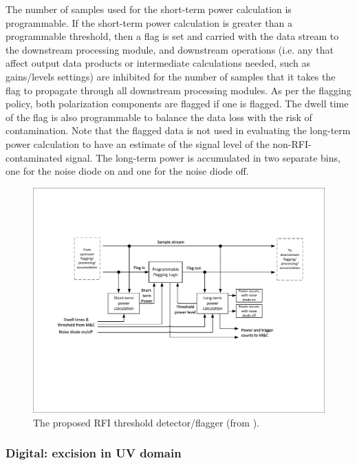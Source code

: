 The number of samples used for the short-term power calculation is programmable. If the short-term power calculation is greater than a programmable threshold,
then a flag is set and carried with the data stream to the downstream processing module, and downstream operations (i.e. any that affect output data products or intermediate calculations needed, such as gains/levels settings) are inhibited for the number of samples that it takes the flag to propagate through all downstream processing modules. As per the flagging policy, both polarization components are flagged if one is flagged. The dwell time of the flag is also programmable to balance the data loss with the risk of contamination. Note that the flagged data is not used in evaluating the long-term power calculation to have an estimate of the signal level of the non-RFI-contaminated signal. The long-term power is accumulated in two separate bins, one for the noise diode on and one for the noise diode off.

\begin{figure}
    \centering
    \includegraphics[height=.28\textheight]{figures/RFI_DF_SKA_Mid_CBF.pdf}
    \caption{The proposed RFI threshold detector/flagger (from \citep{ska_mid_cbf_rfi_2019}).}
    \label{fig:rfi_df_ska_mid_cbf}
\end{figure}


\subsubsection{Digital: excision in UV domain}

